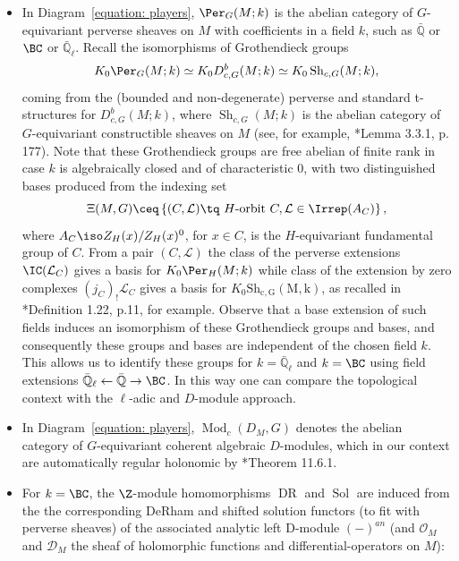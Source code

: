 \documentclass[11pt,letterpaper]{amsart}
\numberwithin{equation}{section}
\begin{document}
\begin{itemize}
    \item 
    In Diagram~\eqref{equation: players}, 
    $\Per_{G}(M;k)$ is the abelian category of $G$-equivariant perverse sheaves on $M$ with coefficients in a field $k$, such as $\bar{\mathbb{Q}}$ or $\BC$ or $\bar{\mathbb{Q}}_\ell$.
    Recall the isomorphisms of Grothendieck groups 
    \[
    K_0 \Per_{G}(M;k)
    \simeq
    K_0 D^b_{c,G}(M;k)
    \simeq 
    K_0 \operatorname{Sh}_{c,G}(M;k),
    \]
    coming from the (bounded and non-degenerate) perverse and standard t-structures for $D^b_{c,G}(M;k)$, where $\operatorname{Sh}_{c,G}(M;k)$ is the abelian category of $G$-equivariant constructible sheaves on $M$ (see, for example, \cite{Sch03}*{Lemma 3.3.1, p. 177}).
    Note that these Grothendieck groups are free abelian of finite rank in case $k$ is algebraically closed and of characteristic $0$, with two distinguished bases produced from the indexing set
    \[
    \Xi(M,G) \ceq \left\{ (C,\mathcal{L}) \tq \textrm{\ $H$-orbit } C , \mathcal{L} \in \Irrep(A_C) \right\},
    \]
    where $A_C \iso Z_H(x)/Z_{H}(x)^0$, for $x\in C$, is the $H$-equivariant fundamental group of $C$.
    From a pair $(C,\mathcal{L})$ the class of the perverse extensions $\IC(\mathcal{L}_C)$ gives a basis for $K_0\Per_{H}(M;k)$ while class of the extension by zero complexes $(j_C)_!\mathcal{L}_C$ gives a basis for $K_0\operatorname{{Sh}_{c,G}(M,k)}$, as recalled in \cite{ABV92}*{Definition 1.22, p.11}, for example.
    Observe that a base extension of such fields induces an isomorphism of these Grothendieck groups and bases, and consequently these groups and bases are independent of the chosen field $k$. This allows us to identify these groups for $k=\bar{\mathbb{Q}}_\ell$ and $k=\BC$ using field extensions $\bar{\mathbb{Q}}_\ell \leftarrow \bar{\mathbb{Q}} \rightarrow \BC$.
    In this way one can compare the topological context with the $\ell$-adic and $D$-module approach.
    \item 
In Diagram~\eqref{equation: players}, $\operatorname{Mod}_{c}(D_M,G)$ denotes the abelian category of $G$-equivariant coherent algebraic $D$-modules, which in our context are automatically regular holonomic by \cite{HTT08}*{Theorem 11.6.1}.
\item 
For $k=\BC$, the $\Z$-module homomorphisms  $\operatorname{DR}$ and $\operatorname{Sol}$ are induced from the the corresponding DeRham and shifted solution functors (to fit with perverse sheaves) of the associated analytic left D-module $(-)^{an}$
(and $\mathcal{O}_M$ and $\mathcal{D}_M$ the sheaf of holomorphic functions and differential-operators on $M$):

\end{itemize}
\end{document}
